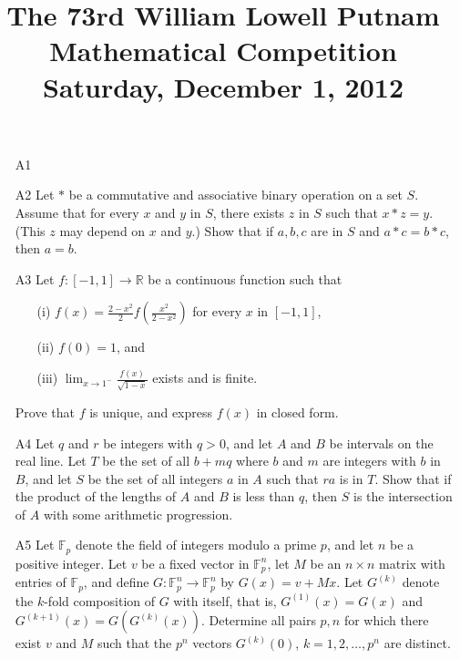 \documentclass[amssymb,twocolumn,pra,10pt,aps]{revtex4-1}
\begin{document}
\title{The 73rd William Lowell Putnam Mathematical Competition \\
    Saturday, December 1, 2012}
\maketitle

\newcommand{\FF}{\mathbb{F}}
\newcommand{\RR}{\mathbb{R}}

\begin{itemize}

\item[A1]

\item[A2]
Let $*$ be a commutative and associative binary operation on a set $S$. Assume that for every $x$
and $y$ in $S$, there exists $z$ in $S$ such that $x * z = y$. (This $z$ may depend on $x$ and $y$.)
Show that if $a,b,c$ are in $S$ and $a*c = b*c$, then $a=b$.

\item[A3]
Let $f: [-1, 1] \to \RR$ be a continuous function such that
\begin{itemize}
\item[(i)]
$f(x) = \frac{2-x^2}{2} f \left( \frac{x^2}{2-x^2} \right)$ for every $x$ in $[-1, 1]$,
\item[(ii)]
$f(0) = 1$, and
\item[(iii)]
$\lim_{x \to 1^-} \frac{f(x)}{\sqrt{1-x}}$ exists and is finite.
\end{itemize}
Prove that $f$ is unique, and express $f(x)$ in closed form.

\item[A4]
Let $q$ and $r$ be integers with $q > 0$, and let $A$ and $B$ be intervals on the real line.
Let $T$ be the set of all $b+mq$ where $b$ and $m$ are integers with $b$ in $B$,
and let $S$ be the set of all integers $a$ in $A$ such that $ra$ is in $T$. Show that if the
product of the lengths of $A$ and $B$ is less than $q$, then $S$ is the intersection of $A$
with some arithmetic progression.

\item[A5]
Let $\FF_p$ denote the field of integers modulo a prime $p$, and let $n$ be a positive integer.
Let $v$ be a fixed vector in $\FF_p^n$, let $M$ be an $n \times n$ matrix with entries of $\FF_p$,
and define $G: \FF_p^n \to \FF_p^n$ by $G(x) = v + Mx$. Let $G^{(k)}$ denote the $k$-fold
composition of $G$ with itself, that is, $G^{(1)}(x) = G(x)$ and $G^{(k+1)}(x) = G(G^{(k)}(x))$.
Determine all pairs $p, n$ for which there exist $v$ and $M$ such that the $p^n$ vectors
$G^{(k)}(0)$, $k=1,2,\dots,p^n$ are distinct.


\end{itemize}
\end{document}
